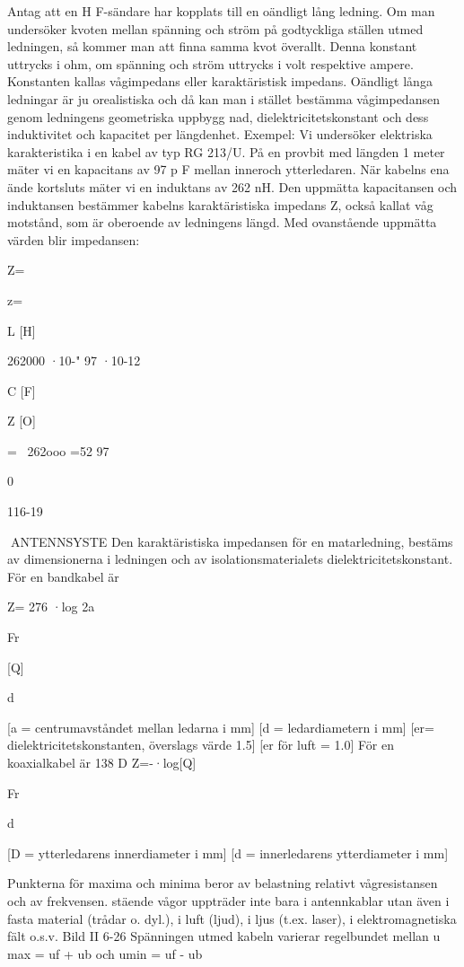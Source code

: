 {{Antag att en H F-sändare har kopplats till en
oändligt lång ledning. Om man undersöker
kvoten mellan spänning och ström på godtyckliga ställen utmed ledningen, så kommer man att finna samma kvot överallt.
Denna konstant uttrycks i ohm, om spänning och ström uttrycks i volt respektive
ampere. Konstanten kallas vågimpedans
eller karaktäristisk impedans.
Oändligt långa ledningar är ju orealistiska och då kan man i stället bestämma vågimpedansen genom ledningens geometriska uppbygg nad, dielektricitetskonstant
och dess induktivitet och kapacitet per längdenhet.
Exempel:
Vi undersöker elektriska karakteristika i
en kabel av typ RG 213/U.
På en provbit med längden 1 meter mäter vi en kapacitans av 97 p F mellan inneroch ytterledaren. När kabelns ena ände
kortsluts mäter vi en induktans av 262 nH.
Den uppmätta kapacitansen och induktansen bestämmer kabelns karaktäristiska
impedans Z, också kallat våg motstånd, som
är oberoende av ledningens längd.
Med ovanstående uppmätta värden blir
impedansen:

Z=\ 

z=

L [H]

262000 ·10-"
97 ·10-12

C [F]

Z [O]

=~ 262ooo =52
97

0

116-19

ANTENNSYSTE
Den karaktäristiska impedansen för en
matarledning, bestäms av dimensionerna i
ledningen och av isolationsmaterialets dielektricitetskonstant.
För en bandkabel är

Z= 276 ·log 2a

Fr

[Q]

d

[a = centrumavståndet mellan ledarna i
mm]
[d = ledardiametern i mm]
[er= dielektricitetskonstanten, överslags
värde 1.5]
[er för luft = 1.0]
För en koaxialkabel är
138
D
Z=-·log[Q]

Fr

d

[D = ytterledarens innerdiameter i mm]
[d = innerledarens ytterdiameter i mm]

Punkterna för maxima och minima beror
av belastning relativt vågresistansen och av
frekvensen.
stäende vågor uppträder inte bara i
antennkablar utan även i fasta material (trådar o. dyl.), i luft (ljud), i ljus (t.ex. laser), i
elektromagnetiska fält o.s.v.
Bild II 6-26
Spänningen utmed kabeln varierar regelbundet mellan
u max = uf + ub och umin = uf - ub

}}
